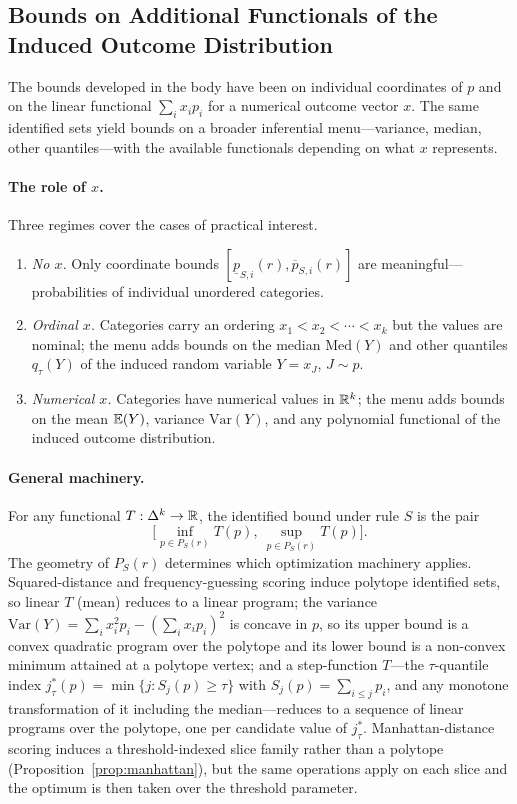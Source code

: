 \subsection{Bounds on Additional Functionals of the Induced Outcome Distribution}\label{app:functional-menu}

The bounds developed in the body have been on individual coordinates of \(p\) and on the linear functional \(\sum_i x_i p_i\) for a numerical outcome vector \(x\). The same identified sets yield bounds on a broader inferential menu---variance, median, other quantiles---with the available functionals depending on what \(x\) represents.

\paragraph{The role of \(x\).} Three regimes cover the cases of practical interest.
\begin{enumerate}
\item[(i)] \emph{No \(x\).} Only coordinate bounds \([\underline p_{S,i}(r), \overline p_{S,i}(r)]\) are meaningful---probabilities of individual unordered categories.
\item[(ii)] \emph{Ordinal \(x\).} Categories carry an ordering \(x_1<x_2<\cdots<x_k\) but the values are nominal; the menu adds bounds on the median \(\mathrm{Med}(Y)\) and other quantiles \(q_\tau(Y)\) of the induced random variable \(Y=x_J\), \(J\sim p\).
\item[(iii)] \emph{Numerical \(x\).} Categories have numerical values in \(\mathbb{R}^k\); the menu adds bounds on the mean \(\mathbb{E}(Y)\), variance \(\mathrm{Var}(Y)\), and any polynomial functional of the induced outcome distribution.
\end{enumerate}

\paragraph{General machinery.} For any functional \(T:\Delta^k\to\mathbb{R}\), the identified bound under rule \(S\) is the pair
\[
\Big[\inf_{p\in P_S(r)} T(p),\ \sup_{p\in P_S(r)} T(p)\Big].
\]
The geometry of \(P_S(r)\) determines which optimization machinery applies. Squared-distance and frequency-guessing scoring induce polytope identified sets, so linear \(T\) (mean) reduces to a linear program; the variance \(\mathrm{Var}(Y)=\sum_i x_i^2 p_i-(\sum_i x_i p_i)^2\) is concave in \(p\), so its upper bound is a convex quadratic program over the polytope and its lower bound is a non-convex minimum attained at a polytope vertex; and a step-function \(T\)---the \(\tau\)-quantile index \(j^*_\tau(p)=\min\{j:S_j(p)\ge\tau\}\) with \(S_j(p)=\sum_{i\le j}p_i\), and any monotone transformation of it including the median---reduces to a sequence of linear programs over the polytope, one per candidate value of \(j^*_\tau\). Manhattan-distance scoring induces a threshold-indexed slice family rather than a polytope (Proposition~\ref{prop:manhattan}), but the same operations apply on each slice and the optimum is then taken over the threshold parameter.


